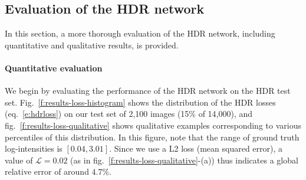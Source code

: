 



\subsection{Evaluation of the HDR network}
\label{ss:hdreval}
In this section, a more thorough evaluation of the HDR network, including quantitative and qualitative results, is provided. 

\paragraph{Quantitative evaluation}

We begin by evaluating the performance of the HDR network on the HDR test set. Fig.~\ref{f:results-loss-histogram} shows the distribution of the HDR losses (eq.~\ref{e:hdrloss}) on our test set of 2,100 images (15\% of 14,000), and fig.~\ref{f:results-loss-qualitative} shows qualitative examples corresponding to various percentiles of this distribution. In this figure, note that the range of ground truth log-intensities is $[0.04, 3.01]$. Since we use a L2 loss (mean squared error), a value of $\mathcal{L} = 0.02$ (as in fig.~\ref{f:results-loss-qualitative}-(a)) thus indicates a global relative error of around $4.7\%$.

